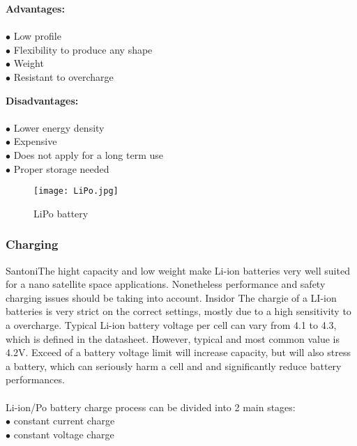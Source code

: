 \begin{multicols}{2}
	
	\textbf{Advantages:} \\ \\
	$\bullet$ Low profile \\
	$\bullet$ Flexibility to produce any shape\\
	$\bullet$ Weight\\
	$\bullet$ Resistant to overcharge\\
	
	
	
	
	\columnbreak
	
	\textbf{Disadvantages:} \\ \\
	$\bullet$ Lower energy density\\
	$\bullet$ Expensive\\
	$\bullet$ Does not apply for a long term use\\
	$\bullet$ Proper storage needed 
	
	
	
\end{multicols}

\begin{figure}[h]
	\centering
	\texttt{[image: LiPo.jpg]}
	\caption{ LiPo battery \cite{12}}
	\label{fig: EPS}
\end{figure}



\subsubsection{Charging}

Santoni\cite{13}The hight capacity and low weight make Li-ion batteries very well suited for a nano satellite space applications. Nonetheless performance and safety charging issues should be taking into account. Insidor\cite{14} The chargie of a LI-ion batteries is very strict on the correct settings, mostly due to a high sensitivity to a overcharge. Typical Li-ion battery voltage per cell can vary from 4.1 to 4.3, which is defined in the datasheet. However, typical and most common value is 4.2V. Exceed of a battery voltage limit will increase capacity, but will also stress a battery, which can seriously harm a cell and and significantly reduce battery performances.\\ \\
Li-ion/Po battery charge process can be divided into 2 main stages:\\
$\bullet$ constant current charge\\
$\bullet$ constant voltage charge\\

